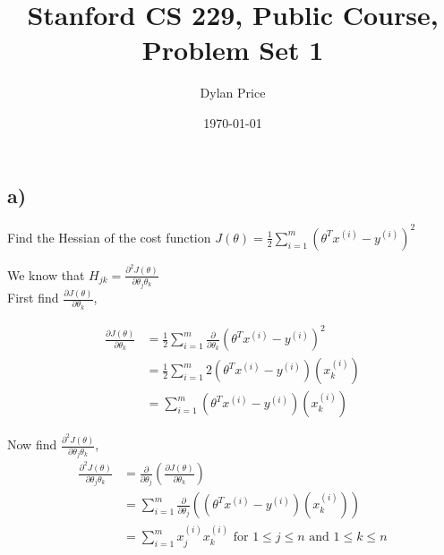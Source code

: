 \documentclass[11pt]{article}
\begin{document}
\title{Stanford CS 229, Public Course, Problem Set 1}
\date{\today}
\author{Dylan Price}
\maketitle 

\newcommand{\pder}[2]{\frac{\partial#1}{\partial#2}}
\newcommand{\thetaT}[0]{\theta^{T}}
\newcommand{\ith}[1]{#1^{(i)}}
\newcommand{\xith}[0]{\ith{x}}
\newcommand{\yith}[0]{\ith{y}}
\newcommand{\sumitom}[0]{\sum_{i=1}^{m}}


\section{}

\subsection*{a)}

Find the Hessian of the cost function $J(\theta) = \frac{1}{2} \sumitom (\thetaT \xith - \yith)^{2}$

We know that $H_{jk} = \frac{\partial^{2}J(\theta)}{\partial\theta_{j}\theta_{k}}$ \\

First find $\frac{\partial J(\theta)}{\partial\theta_{k}}$,

\begin{align*}
  \pder{J(\theta)}{\theta_{k}} &= \frac{1}{2} \sumitom \pder{}{\theta_{k}} (\thetaT \xith - \yith)^{2} \\
  &= \frac{1}{2} \sumitom 2 (\thetaT \xith - \yith)(\ith{x_{k}}) \\
  &= \sumitom (\thetaT \xith - \yith)(\ith{x_{k}})
\end{align*}

Now find $\frac{\partial^{2}J(\theta)}{\partial\theta_{j}\theta_{k}}$, \\

\begin{align*}
  \frac{\partial^{2}J(\theta)}{\partial\theta_{j}\theta_{k}} &= \pder{}{\theta_{j}} ( \pder{J(\theta)}{\theta_{k}} ) \\
  &= \sumitom \pder{}{\theta_{j}} ((\thetaT \xith - \yith)(\ith{x_{k}})) \\
  &= \sumitom \ith{x_{j}} \ith{x_{k}} \text{ for } 1 \leq j \leq n \text{ and } 1 \leq k \leq n
\end{align*}
\end{document}
